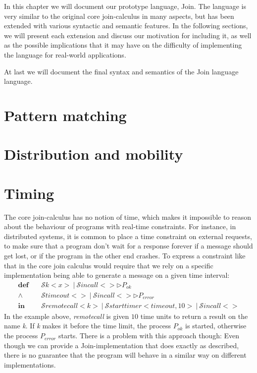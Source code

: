 \def\A{\mathcal{A}}
\def\C{\mathcal{C}}
\def\M{\mathcal{M}}
\def\D{\mathcal{D}}
\def\P{\mathcal{P}}
\def\S{\mathcal{S}}
\def\Q{\mathcal{Q}}
\def\toJ#1{\stackrel{#1}{\triangleright}}
\def\inJ{~\mathbf{in}~}
\def\join#1in#2#3{#1\toJ{#2}#3}
\def\mscG#1#2{\vdash^{#1}_{#2}}
\def\mscJ{\mscG{t}{\phi}}
\def\time#1{\stackrel{t'}{\propto}}
\def\defJ{~\mathbf{def}~}
\def\match{~\mathbf{match}~}
\def\with{~\mathbf{with}~}
\def\linkUp#1{\stackrel{#1}{\diamond}}

In this chapter we will document our prototype language, Join.  The
language is very similar to the original core join-calculus in many
aspects, but has been extended with various syntactic and semantic
features. In the following sections, we will present each extension
and discuss our motivation for including it, as well as the possible
implications that it may have on the difficulty of implementing the
language for real-world applications.

At last we will document the final syntax and semantics of the Join
language language.


\section{Pattern matching}

\section{Distribution and mobility}

\section{Timing}

The core join-calculus has no notion of time, which makes it
impossible to reason about the behaviour of programs with real-time
constraints.  For instance, in distributed systems, it is common to
place a time constraint on external requests, to make sure that a
program don't wait for a response forever if a message should get
lost, or if the program in the other end crashes. To express a
constraint like that in the core join calculus would require that we
rely on a specific implementation being able to generate a message on
a given time interval:
\begin{align*}
  \textbf{def}\quad & \S k<x> ~|~ \S incall<> \triangleright P_{ok} \\
  \land\quad & \S timeout<> ~|~ \S incall<> \triangleright P_{error} \\
  \textbf{in}\quad & \S remotecall<k> ~|~ \S starttimer<timeout, 10>
                                      ~|~ \S incall<>
\end{align*}
In the example above, \emph{remotecall} is given $10$ time units to
return a result on the name \emph{k}. If \emph{k} makes it before the
time limit, the process $P_{ok}$ is started, otherwise the process
$P_{error}$ starts.  There is a problem with this approach though:
Even though we can provide a Join-implementation that does exactly as
described, there is no guarantee that the program will behave in a
similar way on different implementations.

